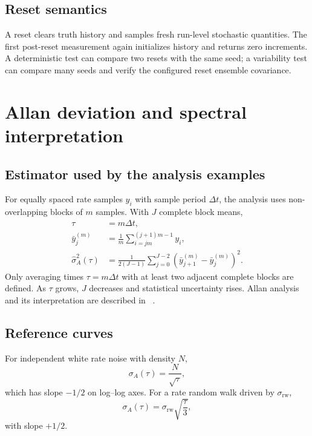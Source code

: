\documentclass[11pt,oneside,headings=big]{scrreprt}
\begin{document}
    \section{Reset semantics}
    A reset clears truth history and samples fresh run-level stochastic quantities.
    The first post-reset measurement again initializes history and returns zero
    increments. A deterministic test can compare two resets with the same seed;
    a variability test can compare many seeds and verify the configured reset
    ensemble covariance.


    \chapter{Allan deviation and spectral interpretation}
    \label{chap:allan}


    \section{Estimator used by the analysis examples}
    For equally spaced rate samples \(y_i\) with sample period \(\Delta t\), the
    analysis uses non-overlapping blocks of \(m\) samples. With \(J\) complete block
    means,
    \begin{align}
        \tau&=m\Delta t,\\
        \bar y_j^{(m)}
        &=\frac{1}{m}\sum_{i=jm}^{(j+1)m-1}y_i,\\
        \widehat\sigma_A^2(\tau)
        &=\frac{1}{2(J-1)}
        \sum_{j=0}^{J-2}
        \left(\bar y_{j+1}^{(m)}-\bar y_j^{(m)}\right)^2.
        \label{eq:allan-estimator}
    \end{align}
    Only averaging times \(\tau=m\Delta t\) with at least two adjacent complete
    blocks are defined. As \(\tau\) grows, \(J\) decreases and statistical
    uncertainty rises. Allan analysis and its interpretation are described in
    ~\cite{allan1966,riley2008,elsheimy2008}.


    \section{Reference curves}
    For independent white rate noise with density \(N\),
    \begin{equation}
        \sigma_A(\tau)=\frac{N}{\sqrt\tau},
        \label{eq:allan-white}
    \end{equation}
    which has slope \(-1/2\) on log--log axes. For a rate random walk driven by
    \(\sigma_{\mathrm{rw}}\),
    \begin{equation}
        \sigma_A(\tau)=\sigma_{\mathrm{rw}}\sqrt{\frac{\tau}{3}},
        \label{eq:allan-rw}
    \end{equation}
    with slope \(+1/2\).
\end{document}
